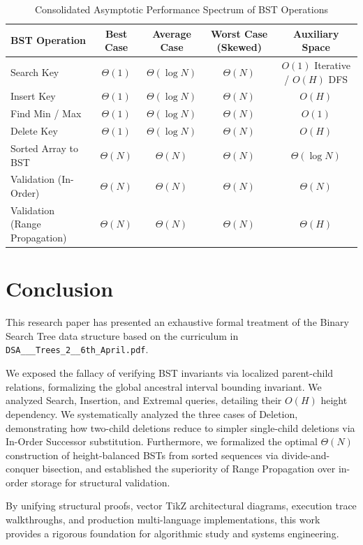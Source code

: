 \documentclass[10pt,journal,compsoc,onecolumn]{IEEEtran}
\begin{document}
\begin{table}[htbp]
\centering
\caption{Consolidated Asymptotic Performance Spectrum of BST Operations}
\label{tab:master_bst_complexity}
\begin{tabular}{lcccc}
\toprule
\textbf{BST Operation} & \textbf{Best Case} & \textbf{Average Case} & \textbf{Worst Case (Skewed)} & \textbf{Auxiliary Space} \\
\midrule
Search Key & $\Theta(1)$ & $\Theta(\log N)$ & $\Theta(N)$ & $O(1)$ Iterative / $O(H)$ DFS \\
Insert Key & $\Theta(1)$ & $\Theta(\log N)$ & $\Theta(N)$ & $O(H)$ \\
Find Min / Max & $\Theta(1)$ & $\Theta(\log N)$ & $\Theta(N)$ & $O(1)$ \\
Delete Key & $\Theta(1)$ & $\Theta(\log N)$ & $\Theta(N)$ & $O(H)$ \\
Sorted Array to BST & $\Theta(N)$ & $\Theta(N)$ & $\Theta(N)$ & $\Theta(\log N)$ \\
Validation (In-Order) & $\Theta(N)$ & $\Theta(N)$ & $\Theta(N)$ & $\Theta(N)$ \\
Validation (Range Propagation) & $\Theta(N)$ & $\Theta(N)$ & $\Theta(N)$ & $\Theta(H)$ \\
\bottomrule
\end{tabular}
\end{table}

\section{Conclusion}
\label{sec:conclusion}

This research paper has presented an exhaustive formal treatment of the Binary Search Tree data structure based on the curriculum in \texttt{DSA\_\_\_Trees\_2\_\_6th\_April.pdf}.

We exposed the fallacy of verifying BST invariants via localized parent-child relations, formalizing the global ancestral interval bounding invariant. We analyzed Search, Insertion, and Extremal queries, detailing their $O(H)$ height dependency. We systematically analyzed the three cases of Deletion, demonstrating how two-child deletions reduce to simpler single-child deletions via In-Order Successor substitution. Furthermore, we formalized the optimal $\Theta(N)$ construction of height-balanced BSTs from sorted sequences via divide-and-conquer bisection, and established the superiority of Range Propagation over in-order storage for structural validation.

By unifying structural proofs, vector TikZ architectural diagrams, execution trace walkthroughs, and production multi-language implementations, this work provides a rigorous foundation for algorithmic study and systems engineering.
\end{document}

